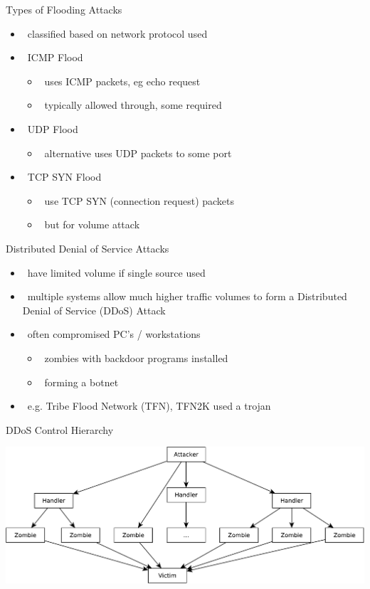 \documentclass{beamer}
\begin{document}
\begin{frame}{Types of Flooding Attacks }
  \begin{itemize}
  \item  classified based on network protocol used 
  \item  ICMP Flood 
    \begin{itemize}
    \item  uses ICMP packets, eg echo request 
    \item  typically allowed through, some required 
    \end{itemize}
  \item  UDP Flood 
    \begin{itemize}
    \item  alternative uses UDP packets to some port 
    \end{itemize}
  \item  TCP SYN Flood 
    \begin{itemize}
    \item  use TCP SYN (connection request) packets 
    \item  but for volume attack 
    \end{itemize}
  \end{itemize}
\end{frame}

\begin{frame}{Distributed Denial of Service Attacks }
  \begin{itemize}
  \item  have limited volume if single source used 
  \item  multiple systems allow much higher traffic 
    volumes to form a Distributed Denial of 
    Service (DDoS) Attack 
  \item  often compromised PC’s / workstations 
    \begin{itemize}
    \item  zombies with backdoor programs installed 
    \item  forming a botnet 
    \end{itemize}
  \item  e.g. Tribe Flood Network (TFN), TFN2K used a 
    trojan
  \end{itemize}
\end{frame}



\begin{frame}{DDoS Control Hierarchy}
  \begin{center}
    \includegraphics[width=1\linewidth]{ddos}
  \end{center}
\end{frame}
\end{document}
